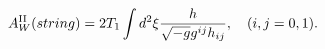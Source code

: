 \begin{equation}
A^{{\rm II}}_{W}(string)=2T_{1}\int d^{2}{\xi}\frac{h}{\sqrt{-g}g^{ij}h_{ij}},
\hspace{10pt}(i,j=0,1).
\end{equation}


